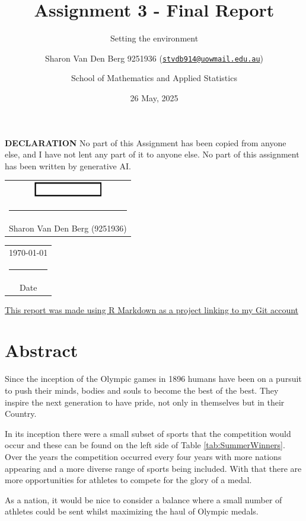 \documentclass[
]{article}
\title{Assignment 3 - Final Report}
\subtitle{Setting the environment}
\author{Sharon Van Den Berg 9251936 (\href{mailto:stvdb914@uowmail.edu.au}{\nolinkurl{stvdb914@uowmail.edu.au}}) \and School of Mathematics and Applied Statistics}
\date{26 May, 2025}
\begin{document}
\maketitle

\textbf{DECLARATION}
No part of this Assignment has been copied from anyone else, and I have not lent any part of it to anyone else. No part of this assignment has been written by generative AI.

    \vspace*{2em}\noindent
    \hfill%
    \begin{tabular}[t]{c}
        \includegraphics[width=3cm]{../images/Sharon.png} \\
        \rule{10em}{0.5pt}\\ Sharon Van Den Berg (9251936)
    \end{tabular}%
    \hfill%
    \begin{tabular}[t]{c}
        \today \\
        \rule{10em}{0.4pt}\\ Date
    \end{tabular}

\href{https://github.com/stvdb914/DSAA811-Final-Report}{This report was made using R Markdown as a project linking to my Git account}

\newpage

\section*{Abstract}\label{abstract}

Since the inception of the Olympic games in 1896 humans have been on a pursuit to push their minds, bodies and souls to become the best of the best. They inspire the next generation to have pride, not only in themselves but in their Country.

In its inception there were a small subset of sports that the competition would occur and these can be found on the left side of Table \ref{tab:SummerWinners}. Over the years the competition occurred every four years with more nations appearing and a more diverse range of sports being included. With that there are more opportunities for athletes to compete for the glory of a medal.

As a nation, it would be nice to consider a balance where a small number of athletes could be sent whilst maximizing the haul of Olympic medals.
\end{document}
